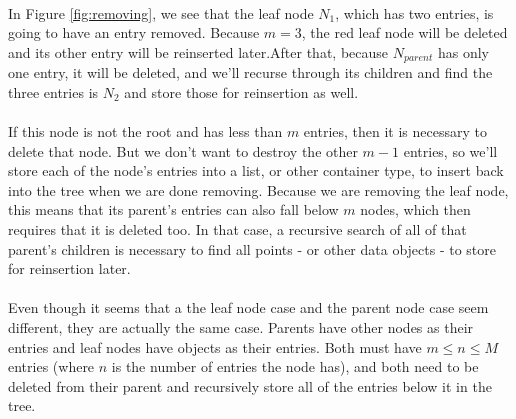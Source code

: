 \documentclass{article}
\begin{document}
\begin{multicols}{2}[]
\begin{minipage}{\columnwidth}
\centering
{}
\label{fig:removing}
\end{minipage}

\paragraph{}
In Figure \ref{fig:removing}, we see that the leaf node $N_1$, which has two entries, is going to have an entry removed. Because $m=3$, the red leaf node will be deleted and its other entry will be reinserted later.After that, because $N_{parent}$ has only one entry, it will be deleted, and we'll recurse through its children and find the three entries is $N_2$ and store those for reinsertion as well.
\paragraph{}
If this node is not the root and has less than $m$ entries, then it is necessary to delete that node. But we don't want to destroy
the other $m - 1$ entries, so we'll store each of the node's entries into a list, or other container type, to insert back into
the tree when we are done removing. Because we are removing the leaf node, this means that its parent's entries can also fall below
$m$ nodes, which then requires that it is deleted too. In that case, a recursive search of all of that parent's children is necessary
to find all points - or other data objects - to store for reinsertion later.
\paragraph{}
Even though it seems that a the leaf node case and the parent node case seem different, they are actually the same case. Parents have
other nodes as their entries and leaf nodes have objects as their entries. Both must have $m \le n \le M$ entries (where $n$ is the number
of entries the node has), and both need to be deleted from their parent and recursively store all of the entries below it in the tree.




\end{multicols}
\end{document}
